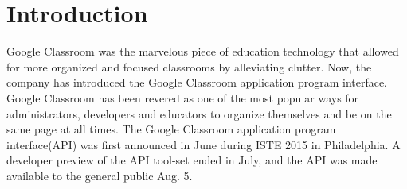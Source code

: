 \documentclass[11pt,]{article}
\begin{document}
\section{Introduction}

Google Classroom\cite{s1} was the marvelous piece of education technology that allowed for more organized and focused classrooms by alleviating clutter. Now, the company has introduced the Google Classroom application program interface.
Google Classroom \cite{s2} has been revered as one of the most popular ways for administrators, developers and educators to organize themselves and be on the same page at all times.
The Google Classroom application program interface(API) was first announced in June during ISTE 2015 in Philadelphia\cite{s3}. A developer preview of the API tool-set ended in July, and the API was made available to the general public Aug. 5.
\end{document}
